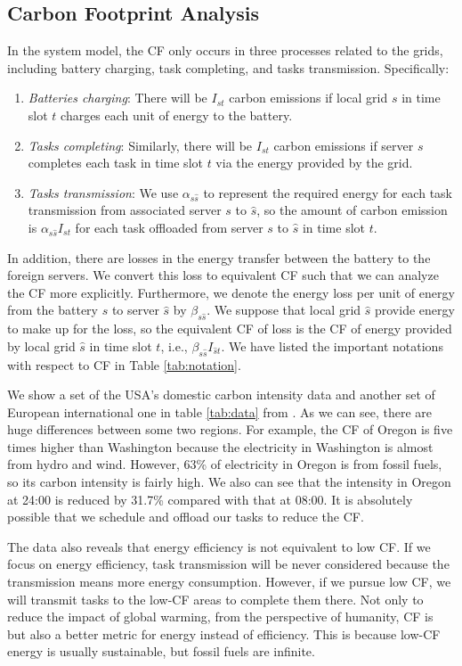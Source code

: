 \documentclass[conference, 10pt, ﬁnal, letterpaper, twocolumn]{IEEEtran}
\begin{document}
\subsection{Carbon Footprint Analysis} \label{subsec:CFA}
In the system model, the CF only occurs in three processes related to the grids, including battery charging, task completing, and tasks transmission. Specifically:
\begin{enumerate}
    \item {\em Batteries charging}: There will be $I_{st}$ carbon emissions if local grid $s$ in time slot $t$ charges each unit of energy to the battery.
    \item {\em Tasks completing}: Similarly, there will be $I_{st}$ carbon emissions if server $s$ completes each task in time slot $t$ via the energy provided by the grid.
    \item {\em Tasks transmission}: We use $\alpha_{s\hat{s}}$ to represent the required energy for each task transmission from associated server ${s}$ to $\hat{s}$, so the amount of carbon emission is $\alpha_{{s}\hat{s}}I_{{s}t}$ for each task offloaded from server ${s}$ to $\hat{s}$ in time slot $t$.
\end{enumerate}
In addition, there are losses in the energy transfer between the battery to the foreign servers. We convert this loss to equivalent CF such that we can analyze the CF more explicitly. Furthermore, we denote the energy loss per unit of energy from the battery ${s}$ to server $\hat{s}$ by $\beta_{{s}\hat{s}}$. We suppose that local grid $\hat{s}$ provide energy to make up for the loss, so the equivalent CF of loss is the CF of energy provided by local grid $\hat{s}$ in time slot $t$, i.e., $\beta_{{s}\hat{s}}I_{\hat{s}t}$. We have listed the important notations with respect to CF in Table \ref{tab:notation}.

We show a set of the USA's domestic carbon intensity data and another set of European international one in table \ref{tab:data} from \cite{ElectricityMaps}. As we can see, there are huge differences between some two regions. For example, the CF of Oregon is five times higher than Washington because the electricity in Washington is almost from hydro and wind. However, 63\% of electricity in Oregon is from fossil fuels, so its carbon intensity is fairly high. We also can see that the intensity in Oregon at 24:00 is reduced by 31.7\% compared with that at 08:00. It is absolutely possible that we schedule and offload our tasks to reduce the CF. 

The data also reveals that energy efficiency is not equivalent to low CF. If we focus on energy efficiency, task transmission will be never considered because the transmission means more energy consumption. However, if we pursue low CF, we will transmit tasks to the low-CF areas to complete them there. Not only to reduce the impact of global warming, from the perspective of humanity, CF is but also a better metric for energy instead of efficiency. This is because low-CF energy is usually sustainable, but fossil fuels are infinite. 
\end{document}
